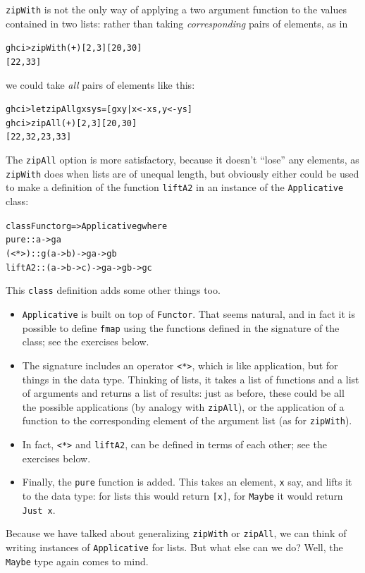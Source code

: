 \texttt{zipWith} is not the only way of applying a two argument function to the values contained in two lists: rather than taking \emph{corresponding} pairs of elements, as in 
\begin{alltt}
ghci> zipWith (+) [2,3] [20,30]
[22,33]
\end{alltt}
we could take \emph{all} pairs of elements like this:
\begin{alltt}
ghci> let zipAll g xs ys = [ g x y | x<-xs, y<-ys ]
ghci> zipAll (+) [2,3] [20,30]
[22,32,23,33]
\end{alltt}
The \texttt{zipAll} option is more satisfactory, because it doesn't ``lose'' any elements, as \texttt{zipWith} does when lists are of unequal length, but obviously either could be used to make a definition of the function \texttt{liftA2} in an instance of the \texttt{Applicative} class:
\begin{alltt}
class Functor g => Applicative g where
  pure :: a -> g a
  (<*>) :: g (a -> b) -> g a -> g b
  liftA2 :: (a -> b -> c) -> g a -> g b -> g c   
\end{alltt}
This \texttt{class} definition adds some other things too.
\begin{itemize}
\item
\texttt{Applicative} is built on top of \texttt{Functor}. That seems natural, and in fact it is possible to define \texttt{fmap} using the functions defined in the signature of the class; see the exercises below.
\item
The signature includes an operator \texttt{<*>}, which is like application, but for things in the data type. Thinking of lists, it takes a list of functions and a list of arguments and returns a list of results: just as before, these could be all the possible applications (by analogy with \texttt{zipAll}), or the application of a function to the corresponding element of the argument list (as for \texttt{zipWith}).
\item 
In fact, \texttt{<*>} and \texttt{liftA2}, can be defined in terms of each other; see the exercises below.
\item 
Finally, the \texttt{pure} function is added. This takes an element, \texttt{x} say, and lifts it to the data type: for lists this would return \texttt{[x]}, for \texttt{Maybe} it would return \texttt{Just x}.
\end{itemize}
Because we have talked about generalizing \texttt{zipWith} or \texttt{zipAll}, we can think of writing instances of \texttt{Applicative} for lists. But what else can we do? Well, the \texttt{Maybe} type again comes to mind.
